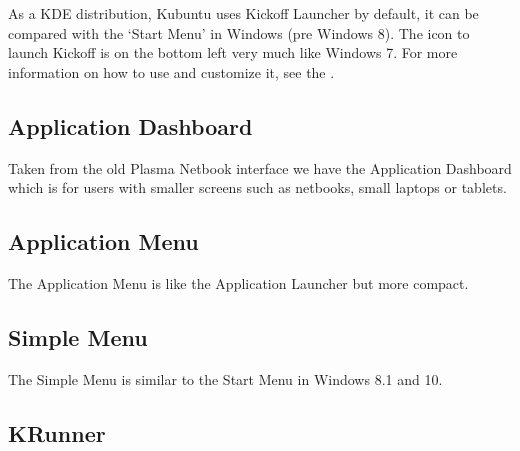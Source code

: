 \documentclass[letterpaper,10pt,english]{sphinxmanual}
\begin{document}
\sphinxAtStartPar
As a KDE distribution, Kubuntu uses Kickoff Launcher by default, it can be compared with the ‘Start Menu’ in Windows (pre Windows 8). The icon to launch Kickoff is on the bottom left very much like Windows 7. For more information on how to use and customize it, see the .


\subsection{Application Dashboard}
\label{\detokenize{docs/basic:application-dashboard}}

\sphinxAtStartPar
Taken from the old Plasma Netbook interface we have the Application Dashboard which is for users with smaller screens such as netbooks, small laptops or tablets.


\subsection{Application Menu}
\label{\detokenize{docs/basic:application-menu}}

\sphinxAtStartPar
The Application Menu is like the Application Launcher but more compact.


\subsection{Simple Menu}
\label{\detokenize{docs/basic:simple-menu}}

\sphinxAtStartPar
The Simple Menu is similar to the Start Menu in Windows 8.1 and 10.


\subsection{KRunner}
\label{\detokenize{docs/basic:krunner}}
\end{document}
